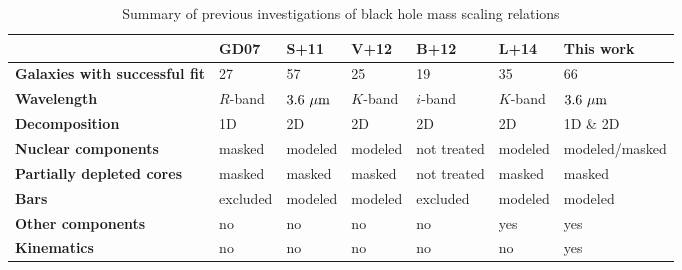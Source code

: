 \documentclass[preprint2]{emulateapj}
\begin{document}
\begin{table}
\begin{center}  				      
\caption{Summary of previous investigations of black hole mass scaling relations} 
\begin{tabular}{lllllll}
\hline
              & {\bf GD07}  & {\bf S+11}   & {\bf V+12} & {\bf B+12}   & {\bf L+14} & {\bf This work}	      \\ 
\hline
{\bf Galaxies with successful fit} & 27		     & 57	       & 25      & 19          & 35      & 66               \\
{\bf Wavelength}        	   & $R$-band	     & $3.6~\rm \mu m$ & $K$-band& $i$-band    & $K$-band& $3.6~\rm \mu m$  \\
{\bf Decomposition}     	   & 1D 	     & 2D	       & 2D	 & 2D	       & 2D	 & 1D \& 2D	    \\
{\bf Nuclear components}       	   & masked	     & modeled         & modeled & not treated & modeled & modeled/masked   \\
{\bf Partially depleted cores} 	   & masked	     & masked	       & masked  & not treated & masked  & masked	    \\ 
{\bf Bars}	        	   & excluded	     & modeled         & modeled & excluded    & modeled & modeled	    \\ 
{\bf Other components}  	   & no 	     & no 	       & no	 & no	       & yes	 & yes  	    \\ 
{\bf Kinematics}        	   & no 	     & no	       & no	 & no	       & no	 & yes  	    \\  
\hline 
\end{tabular}
\label{tab:lit} 
\end{center}	
\end{table}
\end{document}

